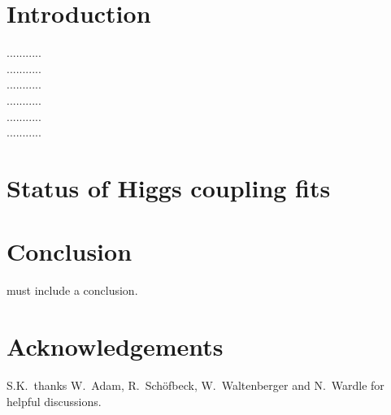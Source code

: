\documentclass[submission, Phys]{SciPost}
\begin{document}


\section{Introduction} \label{sec:intro}

...........\\
...........\\
...........\\
...........\\
...........\\
...........\\







\section{Status of Higgs coupling fits}


\section{Conclusion}
 must include a conclusion.

\section*{Acknowledgements}

S.K.~thanks W.~Adam, R.~Sch\"ofbeck, W.~Waltenberger and N.~Wardle for helpful discussions. 
\end{document}
